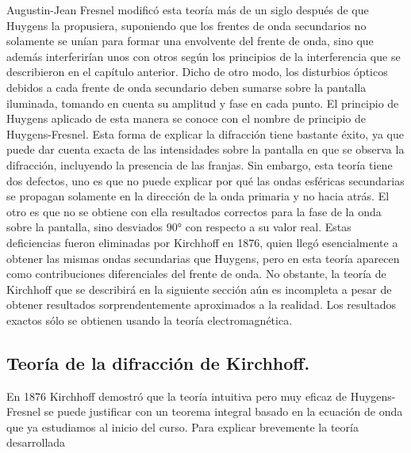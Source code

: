 \documentclass[14pt]{extarticle}
\begin{document}
Augustin-Jean Fresnel modificó esta teoría más de un siglo después de que Huygens la propusiera, suponiendo que los frentes de onda secundarios no solamente se unían para formar una envolvente del frente de onda, sino que además interferirían unos con otros según los principios de la interferencia que se describieron en el capítulo anterior. Dicho de otro modo, los disturbios ópticos debidos a cada frente de onda secundario deben sumarse sobre la pantalla iluminada, tomando en cuenta su amplitud y fase en cada punto. El principio de Huygens aplicado de esta manera se conoce con el nombre de principio de Huygens-Fresnel. Esta forma de explicar la difracción tiene bastante éxito, ya que puede dar cuenta exacta de las intensidades sobre la pantalla en que se observa la difracción, incluyendo la presencia de las franjas. Sin embargo, esta teoría tiene dos defectos, uno es que no puede explicar por qué las ondas esféricas secundarias se propagan solamente en la dirección de la onda primaria y no hacia atrás. El otro es que no se obtiene con ella resultados correctos para la fase de la onda sobre la pantalla, sino desviados 90° con respecto a su valor real. Estas deficiencias fueron eliminadas por Kirchhoff en 1876, quien llegó esencialmente a obtener las mismas ondas secundarias que Huygens, pero en esta teoría aparecen como contribuciones diferenciales del frente de onda. No obstante, la teoría de Kirchhoff que se describirá en la siguiente sección aún es incompleta a pesar de obtener resultados sorprendentemente aproximados a la realidad. Los resultados exactos sólo se obtienen usando la teoría electromagnética.

\subsection{Teoría de la difracción de Kirchhoff.}
 
En 1876 Kirchhoff demostró que la teoría intuitiva pero muy eficaz de Huygens-Fresnel se puede justificar con un teorema integral basado en la ecuación de onda que ya estudiamos al inicio del curso. Para explicar brevemente la teoría desarrollada
\end{document}
